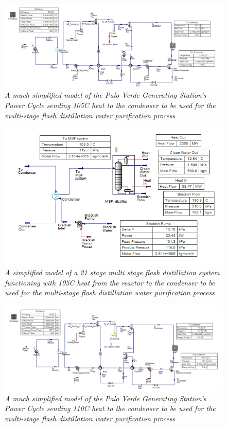 \documentclass[12pt]{UIdahoMastersThesis}
\begin{document}
\begin{figure}
\includegraphics[width=\textwidth]{105PC.PNG}
\caption{\small \sl A much simplified model of the Palo Verde Generating Station's Power Cycle sending 105\degree C heat to the condenser to be used for the multi-stage flash distillation water purification process}
\end{figure}
\begin{figure}
\includegraphics[width=\textwidth]{105MSF.PNG}
\caption{\small \sl A simplified model of a 21 stage multi stage flash distillation system functioning with 105\degree C heat from the reactor to the condenser to be used for the multi-stage flash distillation water purification process}
\end{figure}
\begin{figure}
\includegraphics[width=\textwidth]{110PC.PNG}
\caption{\small \sl A much simplified model of the Palo Verde Generating Station's Power Cycle sending 110\degree C heat to the condenser to be used for the multi-stage flash distillation water purification process}
\end{figure}
\end{document}
